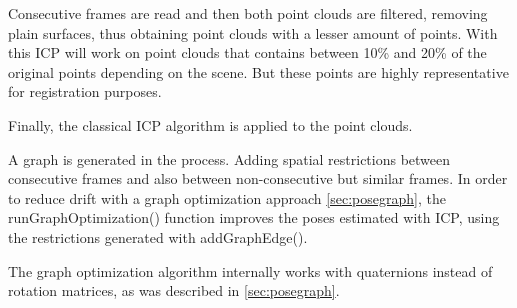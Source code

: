 Consecutive frames are read and then both point clouds are filtered, removing plain surfaces, thus obtaining point clouds 
with a lesser amount of points. With this ICP will work on point clouds that contains  
between 10\% and 20\% of the original points depending on the scene. But these points are highly representative for registration purposes.

Finally, the classical ICP algorithm is applied to the point clouds.

A graph is generated in the process. Adding spatial restrictions between consecutive frames and also between non-consecutive but similar 
frames. In order to reduce drift with a graph optimization approach \ref{sec:posegraph}, the runGraphOptimization() function 
improves the poses estimated with 
 ICP, using the restrictions generated with addGraphEdge(). 


The graph optimization algorithm internally works with quaternions instead of rotation matrices, as was described in \ref{sec:posegraph}.

